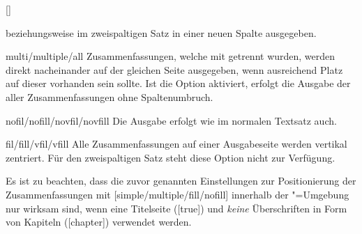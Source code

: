 \begin{Declaration}{[\PSet]}
\begin{values}
  beziehungsweise im zweispaltigen Satz in einer neuen Spalte ausgegeben.
\item[multi/multiple/all]
  Zusammenfassungen, welche mit  getrennt wurden, werden 
  direkt nacheinander auf der gleichen Seite ausgegeben, wenn ausreichend Platz 
  auf dieser vorhanden sein sollte. Ist die Option  aktiviert,
  erfolgt die Ausgabe der aller Zusammenfassungen ohne Spaltenumbruch.
\item[nofil/nofill/novfil/novfill]
  Die Ausgabe erfolgt wie im normalen Textsatz auch.
\item[fil/fill/vfil/vfill]
  Alle Zusammenfassungen auf einer Ausgabeseite werden vertikal zentriert. Für 
  den zweispaltigen Satz steht diese Option nicht zur Verfügung.
\end{values}
Es ist zu beachten, dass die zuvor genannten Einstellungen zur Positionierung 
der Zusammenfassungen mit [simple/multiple/fill/nofill] 
innerhalb der "=Umgebung nur wirksam sind, wenn eine 
Titelseite ([true]) und \emph{keine} Überschriften in Form 
von Kapiteln ([chapter]) verwendet werden.
\end{Declaration}

